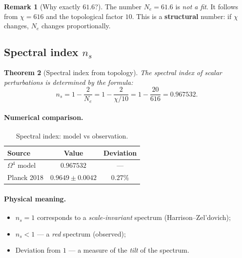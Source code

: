 \documentclass[11pt,a4paper]{article}
\newcommand{\Om}{\Omega^4}
\newtheorem{theorem}{Theorem}[section]
\theoremstyle{definition}
\newtheorem{remark}[theorem]{Remark}
\begin{document}
\begin{remark}[Why exactly $61.6$?]
\label{rem:why-61-6}
The number $N_e = 61.6$ is \emph{not a fit}. It follows from 
$\chi = 616$ and the topological factor $10$. This is a 
\textbf{structural} number: if $\chi$ changes, 
$N_e$ changes proportionally.
\end{remark}

\subsection{Spectral index $n_s$}
\label{subsec:ns}

\begin{theorem}[Spectral index from topology]
\label{thm:ns}
The spectral index of scalar perturbations is determined by the formula:
\begin{equation}
    \boxed{
    n_s = 1 - \frac{2}{N_e} = 1 - \frac{2}{\chi/10}
    = 1 - \frac{20}{616} = 0.967532.
    }
    \label{eq:ns-main}
\end{equation}
\end{theorem}

\paragraph{Numerical comparison.}
\begin{table}[htbp]
\centering
\caption{Spectral index: model vs observation.}
\label{tab:ns-comparison}
\begin{tabular}{lcc}
\toprule
Source & Value & Deviation \\ 
\midrule
$\Om$ model & $0.967532$ & --- \\[0.3em]
Planck 2018 & $0.9649 \pm 0.0042$ & $0.27\%$ \\ 
\bottomrule
\end{tabular}
\end{table}

\paragraph{Physical meaning.}
\begin{itemize}
    \item $n_s = 1$ corresponds to a \emph{scale-invariant} 
          spectrum (Harrison--Zel'dovich);
    \item $n_s < 1$ — a \emph{red} spectrum (observed);
    \item Deviation from $1$ — a measure of the \emph{tilt} of the spectrum.
\end{itemize}
\end{document}
